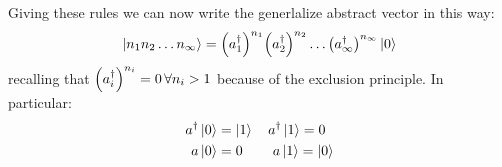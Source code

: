 \documentclass[../main/main.tex]{subfiles}
\begin{document}
Giving these rules we can now write the generlalize abstract vector in this way: 
\begin{equation}
  \ket{n_1 n_2 \dots n_ \infty } = \qty(a_1^\dag)^{n_1}\qty(a_2^\dag)^{n_2} \dots \qty(a_ \infty ^\dag)^{n_ \infty } \ket{0}
\end{equation}
recalling that \( \qty(a_i^\dag)^{n_i} = 0 \, \forall n_i>1\) because of the exclusion principle.
In particular:
\begin{subequations}
\begin{align*}
   a^\dag \ket{0} &= \ket{1} \quad a^\dag \ket{1} = 0 \\
   a \ket{0} &= 0   \quad \quad \, a \ket{1} = \ket{0}
\end{align*}
\end{subequations}
\end{document}

